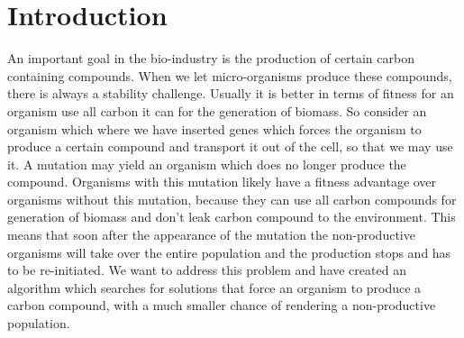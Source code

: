 \documentclass[10pt]{report}
\begin{document}
\section{Introduction}
An important goal in the bio-industry is the production of certain carbon containing compounds. When we let micro-organisms produce these compounds, there is always a stability challenge. Usually it is better in terms of fitness for an organism use all carbon it can for the generation of biomass. So consider an organism which where we have inserted genes which forces the organism to produce a certain compound and transport it out of the cell, so that we may use it. A mutation may yield an organism which does no longer produce the compound. Organisms with this mutation likely have a fitness advantage over organisms without this mutation, because they can use all carbon compounds for generation of biomass and don't leak carbon compound to the environment. This means that soon after the appearance of the mutation the non-productive organisms will take over the entire population and the production stops and has to be re-initiated. We want to address this problem and have created an algorithm which searches for solutions that force an organism to produce a carbon compound, with a much smaller chance of rendering a non-productive population.
\end{document}

